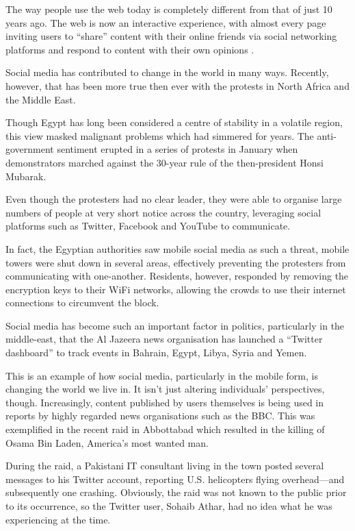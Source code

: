 \documentclass[a4paper,11pt]{article}
\begin{document}
    The way people use the web today is completely different
    from that of just 10 years ago. The web is now an interactive experience,
    with almost every page inviting users to ``share'' content with their
    online friends via social networking platforms and respond to content with
    their own opinions \cite{smith2009}.

    Social media has contributed to change in the world in many ways. Recently,
    however, that has been more true then ever with the protests in North
    Africa and the Middle East.

    Though Egypt has long been considered a centre of stability in a volatile
    region, this view masked malignant problems which had simmered for years.
    The anti-government sentiment erupted in a series of protests in January
    when demonstrators marched against the 30-year rule of the then-president
    Honsi Mubarak.

    Even though the protesters had no clear leader, they were able to organise
    large numbers of people at very short notice across the country, leveraging
    social platforms such as Twitter, Facebook and YouTube to communicate.

    In fact, the Egyptian authorities saw mobile social media as such a threat,
    mobile towers were shut down in several areas, effectively preventing the
    protesters from communicating with one-another. Residents, however,
    responded by removing the encryption keys to their WiFi networks, allowing
    the crowds to use their internet connections to circumvent the block.

    Social media has become such an important factor in politics, particularly
    in the middle-east, that the Al Jazeera news organisation has launched
    a ``Twitter dashboard'' to track events in Bahrain, Egypt, Libya, Syria and
    Yemen.

    This is an example of how social media, particularly in the mobile form, is
    changing the world we live in. It isn't just altering individuals'
    perspectives, though. Increasingly, content published by users themselves
    is being used in reports by highly regarded news organisations such as the
    BBC. This was exemplified in the recent raid in Abbottabad which resulted
    in the killing of Osama Bin Laden, America's most wanted man.

    During the raid, a Pakistani IT consultant living in the town posted
    several messages to his Twitter account, reporting U.S. helicopters flying
    overhead---and subsequently one crashing. Obviously, the raid was not known
    to the public prior to its occurrence, so the Twitter user, Sohaib Athar,
    had no idea what he was experiencing at the time.
\end{document}
